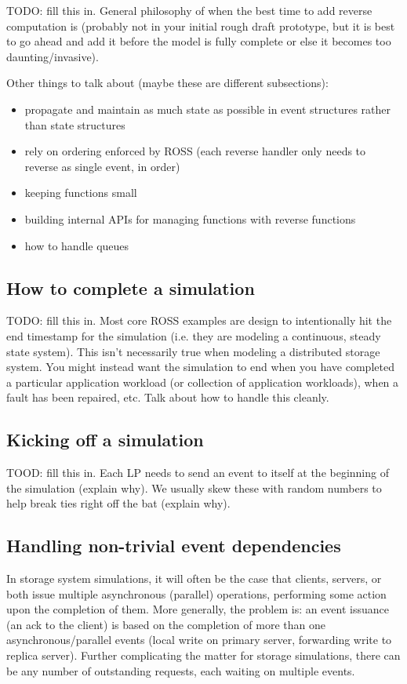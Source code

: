 \documentclass[conference,10pt,compsocconf,onecolumn]{IEEEtran}
\begin{document}
TODO: fill this in.  General philosophy of when the best time to add reverse
computation is (probably not in your initial rough draft prototype, but it
is best to go ahead and add it before the model is fully complete or else it
becomes too daunting/invasive).

Other things to talk about (maybe these are different subsections):
\begin{itemize}
\item propagate and maintain as much state as possible in event structures
rather than state structures
\item rely on ordering enforced by ROSS (each
reverse handler only needs to reverse as single event, in order)
\item keeping functions small 
\item building internal APIs for managing functions with reverse functions
\item how to handle queues
\end{itemize}

\subsection{How to complete a simulation}

TODO: fill this in.  Most core ROSS examples are design to intentionally hit
the end timestamp for the simulation (i.e. they are modeling a continuous,
steady state system).  This isn't necessarily true when modeling a
distributed storage system.  You might instead want the simulation to end
when you have completed a particular application workload (or collection of
application workloads), when a fault has been repaired, etc.  Talk about how
to handle this cleanly.

\subsection{Kicking off a simulation}
\label{sec_kickoff}

TOOD: fill this in.  Each LP needs to send an event to itself at the
beginning of the simulation (explain why).  We usually skew these with
random numbers to help break ties right off the bat (explain why).

\subsection{Handling non-trivial event dependencies}

In storage system simulations, it will often be the case that clients, servers,
or both issue multiple asynchronous (parallel) operations, performing some
action upon the completion of them. More generally, the problem is: an event
issuance (an ack to the client) is based on the completion of more than one
asynchronous/parallel events (local write on primary server, forwarding write to
replica server). Further complicating the matter for storage simulations, there
can be any number of outstanding requests, each waiting on multiple events. 
\end{document}
